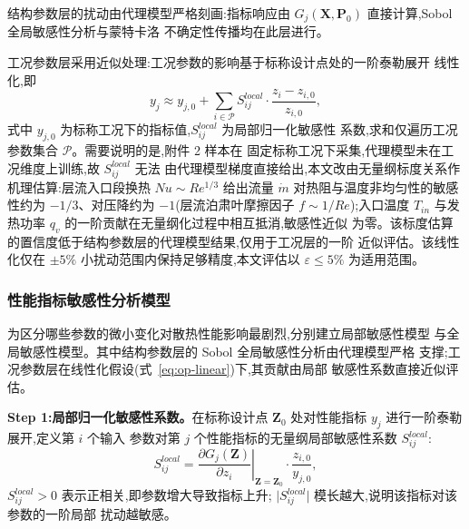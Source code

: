 结构参数层的扰动由代理模型严格刻画:指标响应由
$G_j(\mathbf{X}, \mathbf{P}_0)$ 直接计算,Sobol 全局敏感性分析\cite{Sobol2001}与蒙特卡洛
不确定性传播\cite{McKay1979}均在此层进行。

工况参数层采用近似处理:工况参数的影响基于标称设计点处的一阶泰勒展开
线性化,即
\begin{equation}
  y_j \approx y_{j,0} + \sum_{i \in \mathcal{P}} S_{ij}^{local}
  \cdot \frac{z_i - z_{i,0}}{z_{i,0}},
  \label{eq:op-linear}
\end{equation}
式中 $y_{j,0}$ 为标称工况下的指标值,$S_{ij}^{local}$ 为局部归一化敏感性
系数,求和仅遍历工况参数集合 $\mathcal{P}$。需要说明的是,附件 2 样本在
固定标称工况下采集,代理模型未在工况维度上训练,故 $S_{ij}^{local}$ 无法
由代理模型梯度直接给出,本文改由无量纲标度关系作机理估算:层流入口段换热
$Nu \sim Re^{1/3}$ 给出流量 $\dot{m}$ 对热阻与温度非均匀性的敏感性约为
$-1/3$、对压降约为 $-1$(层流泊肃叶摩擦因子 $f \sim 1/Re$);入口温度
$T_{in}$ 与发热功率 $q_v$ 的一阶贡献在无量纲化过程中相互抵消,敏感性近似
为零。该标度估算的置信度低于结构参数层的代理模型结果,仅用于工况层的一阶
近似评估。该线性化仅在 $\pm 5\%$ 小扰动范围内保持足够精度,本文评估以
$\varepsilon \le 5\%$ 为适用范围。

\subsubsection{性能指标敏感性分析模型}

为区分哪些参数的微小变化对散热性能影响最剧烈,分别建立局部敏感性模型
与全局敏感性模型。其中结构参数层的 Sobol 全局敏感性分析由代理模型严格
支撑;工况参数层在线性化假设(式~\eqref{eq:op-linear})下,其贡献由局部
敏感性系数直接近似评估。

\textbf{Step 1:局部归一化敏感性系数。}在标称设计点
$\mathbf{Z}_0$ 处对性能指标 $y_j$ 进行一阶泰勒展开,定义第 $i$ 个输入
参数对第 $j$ 个性能指标的无量纲局部敏感性系数 $S_{ij}^{local}$:
\begin{equation}
  S_{ij}^{local} = \left. \frac{\partial G_j(\mathbf{Z})}{\partial z_i}
  \right\vert_{\mathbf{Z}=\mathbf{Z}_0} \cdot \frac{z_{i,0}}{y_{j,0}},
  \label{eq:lsa}
\end{equation}
$S_{ij}^{local} > 0$ 表示正相关,即参数增大导致指标上升;
$\vert S_{ij}^{local} \vert$ 模长越大,说明该指标对该参数的一阶局部
扰动越敏感。

